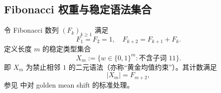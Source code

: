 \subsection{Fibonacci 权重与稳定语法集合}\label{subsec:folding-fibonacci-stable-syntax}

令 Fibonacci 数列 $(F_k)_{k\ge1}$ 满足
\[
F_1=F_2=1,\quad F_{k+2}=F_{k+1}+F_k.
\]
定义长度 $m$ 的稳定类型集合
\[
X_m:=\{w\in\{0,1\}^m:\text{不含子词 }11\}.
\]
即 $X_m$ 为禁止相邻 $1$ 的二元语法（亦称“黄金均值约束”）。其计数满足
\[
|X_m|=F_{m+2},
\]
参见 \cite{LindMarcus1995} 中对 golden mean shift 的标准处理。
